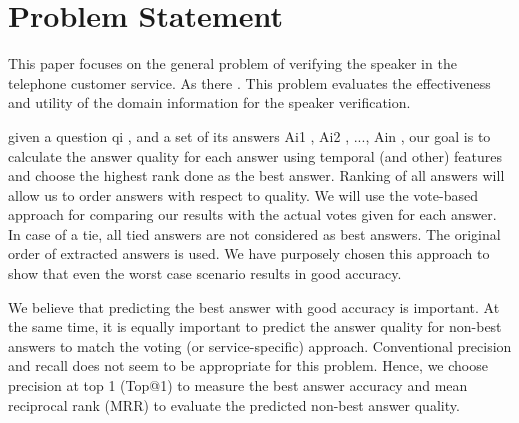 \section{Problem Statement}
\label{sec:problemstatement}

This paper focuses on the general problem of verifying the speaker in the telephone customer service. As there . This problem evaluates the effectiveness and utility of the domain information for the speaker verification.

given a question qi , and a set of its answers {Ai1 , Ai2 , ..., Ain }, our goal is to calculate the answer quality for each answer using temporal (and other) features and choose the highest rank done as the best answer. Ranking of all answers will allow us to order answers with respect to quality. We will use the vote-based approach for comparing our results with the actual votes given for each answer. In case of a tie, all tied answers are not considered as best answers. The original order of extracted answers is used. We have purposely chosen this approach to show that even the worst case scenario results in good accuracy.

We believe that predicting the best answer with good accuracy is important. At the same time, it is equally important to predict the answer quality for non-best answers to match the voting (or service-specific) approach. Conventional precision and recall does not seem to be appropriate for this problem. Hence, we choose precision at top 1 (Top@1) to measure the best answer accuracy and mean reciprocal rank (MRR) to evaluate the predicted non-best answer quality.


